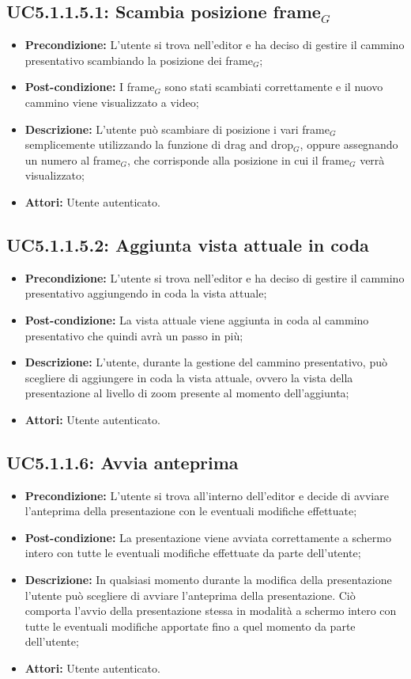 \subsection{ UC5.1.1.5.1: Scambia posizione frame$_G$}

\begin{itemize}
	\item \textbf{Precondizione:} L’utente si trova nell'editor e ha deciso di gestire il cammino presentativo scambiando la posizione dei frame$_G$;
	\item \textbf{Post-condizione:} I frame$_G$ sono stati scambiati correttamente e il nuovo cammino viene visualizzato a video;
	\item \textbf{Descrizione:} L’utente può scambiare di posizione i vari frame$_G$ semplicemente utilizzando la funzione di drag and drop$_G$, oppure assegnando un numero al frame$_G$, che corrisponde alla posizione in cui il frame$_G$ verrà visualizzato;
	\item \textbf{Attori:} Utente autenticato.
\end{itemize}
\subsection{ UC5.1.1.5.2: Aggiunta vista attuale in coda}

\begin{itemize}
	\item \textbf{Precondizione:} L’utente si trova nell'editor e ha deciso di gestire il cammino presentativo aggiungendo in coda la vista attuale;
	\item \textbf{Post-condizione:} La vista attuale viene aggiunta in coda al cammino presentativo che quindi avrà un passo in più;
	\item \textbf{Descrizione:} L’utente, durante la gestione del cammino presentativo, può scegliere di aggiungere in coda la vista attuale, ovvero la vista della presentazione al livello di zoom presente al momento dell’aggiunta;
	\item \textbf{Attori:} Utente autenticato.
\end{itemize}
\subsection{ UC5.1.1.6: Avvia anteprima}

\begin{itemize}
	\item \textbf{Precondizione:} L’utente si trova all’interno dell’editor e decide di avviare l’anteprima della presentazione con le eventuali modifiche effettuate;
	\item \textbf{Post-condizione:} La presentazione viene avviata correttamente a schermo intero con tutte le eventuali modifiche effettuate da parte dell’utente;
	\item \textbf{Descrizione:} In qualsiasi momento durante la modifica della presentazione l’utente può scegliere di avviare l’anteprima della presentazione. Ciò comporta l’avvio della presentazione stessa in modalità a schermo intero con tutte le eventuali modifiche apportate fino a quel momento da parte dell’utente;
	\item \textbf{Attori:} Utente autenticato.
\end{itemize}
